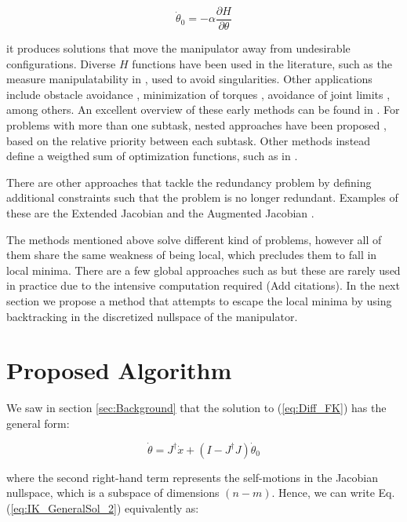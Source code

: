 \documentclass[conference]{IEEEtran}
\newcommand{\J}{ \ensuremath{J} }
\newcommand{\Jps}{ \ensuremath{J^{\dagger}} }
\newcommand{\dx}{ \ensuremath{\dot{x}} }
\newcommand{\dq}{ \ensuremath{\dot{\theta}} }
\newcommand{\q}{ \ensuremath{\theta } }
\begin{document}
\begin{equation}
\dq_{0} = -\alpha \dfrac{\partial H}{\partial \q}
\end{equation}

it produces solutions that move the manipulator away from undesirable configurations. 
Diverse $H$ functions have been used in the literature, such as the measure manipulatability
 in \cite{yoshikawa-ns-1985}, used to avoid singularities. Other applications include obstacle
avoidance \cite{klein-ns-1985}, minimization of torques \cite{hollerbach-ns-1985}, avoidance
of joint limits \cite{liegeois-ns-1977}, among others. An excellent overview of these early
methods can be found in \cite{siciliano-ns-1990}. For problems with more than one subtask,
nested approaches have been proposed \cite{chiaverini-ns-1997}\cite{nakamura-ns-1987}, 
based on the relative priority between each subtask. Other methods instead define a weigthed
sum of optimization functions, such as in \cite{buss-ns-2006}. 

There are other approaches that tackle the redundancy problem by defining additional constraints
 such that the problem is no longer redundant. Examples of these are the Extended Jacobian 
\cite{baillieul-ns-1985} and the Augmented Jacobian \cite{sciavicco-ns-1988}\cite{egeland-ns-1987}. 

The methods mentioned above solve different kind of problems, however all of them share the same 
weakness of being local, which precludes them to fall in local minima. There are a few global 
approaches such as  but these are rarely used in practice due to the intensive computation required
(Add citations). In the next section we propose a method that attempts to escape the local minima by 
using backtracking in the discretized nullspace of the manipulator.

\section{Proposed Algorithm}
\label{sec:ProposedAlgorithm}

We saw in section \ref{sec:Background} that the solution to (\ref{eq:Diff_FK}) has the general form:

\begin{equation}
\dq = \Jps \dx + (I - \Jps \J)\dq_{0}
\label{eq:IK_GeneralSol_2}
\end{equation}

where the second right-hand term represents the self-motions in the Jacobian nullspace, which is a
subspace of dimensions $(n-m)$. Hence, we can write Eq.(\ref{eq:IK_GeneralSol_2}) equivalently as:
\end{document}
